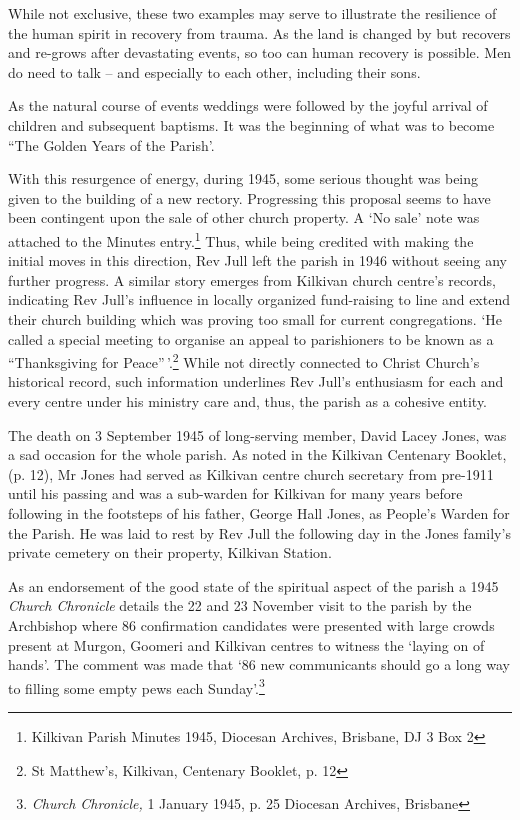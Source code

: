 While not exclusive, these two examples may serve to illustrate the resilience of the human spirit in recovery from trauma. As the land is changed by but recovers and re-grows after devastating events, so too can human recovery is possible. Men do need to talk -- and especially to each other, including their sons.

As the natural course of events weddings were followed by the joyful arrival of children and subsequent baptisms. It was the beginning of what was to become ``The Golden Years of the Parish'.

With this resurgence of energy, during 1945, some serious thought was being given to the building of a new rectory. Progressing this proposal seems to have been contingent upon the sale of other church property. A `No sale' note was attached to the Minutes entry.\footnote{Kilkivan Parish Minutes 1945, Diocesan Archives, Brisbane, DJ 3 Box 2} Thus, while being credited with making the initial moves in this direction, Rev Jull left the parish in 1946 without seeing any further progress. A similar story emerges from Kilkivan church centre's records, indicating Rev Jull's influence in locally organized fund-raising to line and extend their church building which was proving too small for current congregations. `He called a special meeting to organise an appeal to parishioners to be known as a ``Thanksgiving for Peace''\,'.\footnote{St Matthew's, Kilkivan, Centenary Booklet, p. 12} While not directly connected to Christ Church's historical record, such information underlines Rev Jull's enthusiasm for each and every centre under his ministry care and, thus, the parish as a cohesive entity.

The death on 3 September 1945 of long-serving member, David Lacey Jones, was a sad occasion for the whole parish. As noted in the Kilkivan Centenary Booklet, (p. 12), Mr Jones had served as Kilkivan centre church secretary from pre-1911 until his passing and was a sub-warden for Kilkivan for many years before following in the footsteps of his father, George Hall Jones, as People's Warden for the Parish. He was laid to rest by Rev Jull the following day in the Jones family's private cemetery on their property, Kilkivan Station.

As an endorsement of the good state of the spiritual aspect of the parish a 1945 \emph{Church Chronicle} details the 22 and 23 November visit to the parish by the Archbishop where 86 confirmation candidates were presented with large crowds present at Murgon, Goomeri and Kilkivan centres to witness the `laying on of hands'. The comment was made that `86 new communicants should go a long way to filling some empty pews each Sunday'.\footnote{\emph{Church Chronicle,} 1 January 1945, p. 25 Diocesan Archives, Brisbane}

